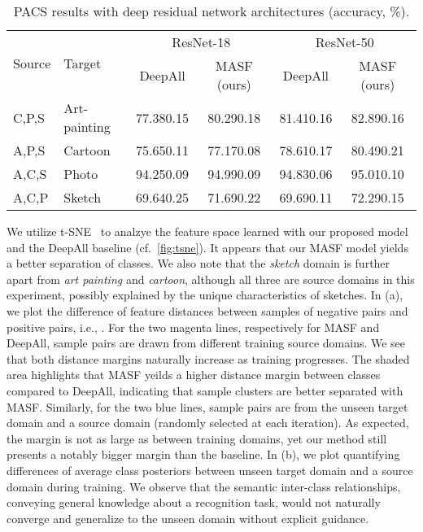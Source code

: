 \documentclass{article}
\begin{document}
\begin{table}[h!]
    \centering
    \let\oldpm\pm
    \renewcommand{\pm}{\,\oldpm\,}
    \caption{PACS results with deep residual network architectures (accuracy, \%).}
    \label{tab:resnet_jigen}
    \begin{adjustbox}{scale=.85}
    \begin{tabular}{llcccc}
        \toprule
   \multirow{2}{*}{Source}  &  \multirow{2}{*}{Target}  &  \multicolumn{2}{c}{ResNet-18} & \multicolumn{2}{c}{ResNet-50} \\
\cmidrule(lr){3-4} \cmidrule(lr){5-6}
       &   & DeepAll & MASF (ours)      & DeepAll & MASF (ours) \\
\midrule
{C},{P},{S}       &  Art-painting        & 77.380.15      & 80.290.18    & 81.410.16    & 82.890.16 \\
{A},{P},{S}       &  Cartoon             & 75.650.11      & 77.170.08    & 78.610.17    & 80.490.21 \\
{A},{C},{S}       &  Photo               & 94.250.09      & 94.990.09    & 94.830.06    & 95.010.10 \\
{A},{C},{P}       &  Sketch              & 69.640.25      & 71.690.22    & 69.690.11    & 72.290.15 \\
        \bottomrule
    \end{tabular}
    \end{adjustbox}
\end{table}

We utilize t-SNE~\citep{maaten2008visualizing} to analzye the feature space learned with our proposed model and the DeepAll baseline (cf.~\cref{fig:tsne}). It appears that our MASF model yields a better separation of classes. We also note that the \emph{sketch} domain is further apart from \emph{art painting} and \emph{cartoon}, although all three are source domains in this experiment, possibly explained by the unique characteristics of sketches. In  (a), we plot the difference of feature distances between samples of negative pairs and positive pairs, i.e., . 
For the two magenta lines, respectively for MASF and DeepAll, sample pairs are drawn from different training source domains.
We see that both distance margins naturally increase as training progresses. The shaded area highlights that MASF yeilds a higher distance margin between classes compared to DeepAll, indicating that sample clusters are better separated with MASF.
Similarly, for the two blue lines, sample pairs are from the unseen target domain and a source domain (randomly selected at each iteration). As expected, the margin is not as large as between training domains, yet our method still presents a notably bigger margin than the baseline. In  (b), we plot  quantifying differences of average class posteriors between unseen target domain and a source domain during training. We observe that the semantic inter-class relationships, conveying general knowledge about a recognition task, would not naturally converge and generalize to the unseen domain without explicit guidance.
\end{document}
